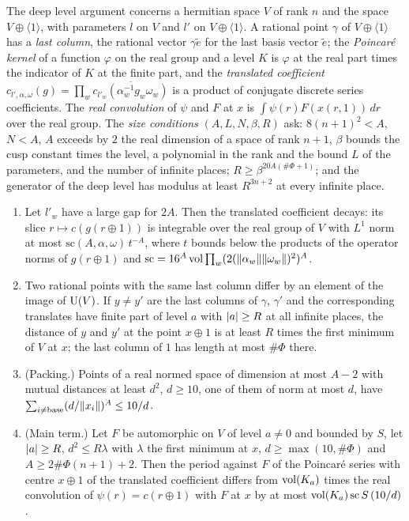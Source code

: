 The deep level argument concerns a hermitian space $V$ of rank $n$ and the space $V\oplus\langle1\rangle$, with parameters $l$ on $V$ and $l'$ on $V\oplus\langle1\rangle$. A rational point $\gamma$ of $V\oplus\langle1\rangle$ has a \emph{last
column}, the rational vector $\gamma\tilde e$ for the last basis vector $\tilde e$; the \emph{Poincar\'e kernel} of a function $\varphi$ on the real group and a level $K$ is $\varphi$ at the real part times the indicator of $K$ at
the finite part, and the \emph{translated coefficient} $c_{l',\alpha,\omega}(g)=\prod_w\overline{c_{l'_w}(\alpha_w^{-1}g_w\omega_w)}$ is a product of conjugate discrete series coefficients. The \emph{real convolution} of $\psi$ and $F$ at $x$ is
$\int\psi(r)F(x(r,1))\,dr$ over the real group. The \emph{size conditions} $(A,L,N,\beta,R)$ ask: $8(n+1)^2<A$, $N<A$, $A$ exceeds by $2$ the real dimension of a space of rank $n+1$, $\beta$ bounds the cusp constant times the
level, a polynomial in the rank and the bound $L$ of the parameters, and the number of infinite places; $R\ge\beta^{20A(\#\Phi+1)}$; and the generator of the deep level has modulus at least $R^{3n+2}$ at every infinite place.

\begin{lemma}\label{lem:deep-poincare}
\begin{enumerate}[label=\textup{(\alph*)}]
\item Let $l'_w$ have a large gap for $2A$. Then the translated coefficient decays: its slice $r\mapsto c(g(r\oplus1))$ is integrable over the real group of $V$ with $L^1$ norm at most $\mathrm{sc}(A,\alpha,\omega)\,t^{-A}$, where $t$ bounds below
the products of the operator norms of $g(r\oplus1)$ and $\mathrm{sc}=16^A\operatorname{vol}\prod_w(2(\lVert \alpha_w\rVert\lVert \omega_w\rVert)^2)^A$.
\item Two rational points with the same last column differ by an element of the image of $\operatorname{U}(V)$. If $y\ne y'$ are the last columns of $\gamma$, $\gamma'$ and the corresponding translates have finite part of level $a$ with
$\lvert a\rvert\ge R$ at all infinite places, the distance of $y$ and $y'$ at the point $x\oplus1$ is at least $R$ times the first minimum of $V$ at $x$; the last column of $1$ has length at most $\#\Phi$ there.
\item (Packing.) Points of a real normed space of dimension at most $A-2$ with mutual distances at least $d^2$, $d\ge10$, one of them of norm at most $d$, have $\sum_{i\ne\mathrm{base}}(d/\lVert x_i\rVert)^A\le10/d$.
\item (Main term.) Let $F$ be automorphic on $V$ of level $a\ne0$ and bounded by $S$, let $\lvert a\rvert\ge R$, $d^2\le R\lambda$ with $\lambda$ the first minimum at $x$, $d\ge\max(10,\#\Phi)$ and $A\ge2\#\Phi(n+1)+2$. Then the period against $F$ of
the Poincar\'e series with centre $x\oplus1$ of the translated coefficient differs from $\operatorname{vol}(K_a)$ times the real convolution of $\psi(r)=c(r\oplus1)$ with $F$ at $x$ by at most $\operatorname{vol}(K_a)\,\mathrm{sc}\,S\,(10/d)$.
\end{enumerate}
\end{lemma}

